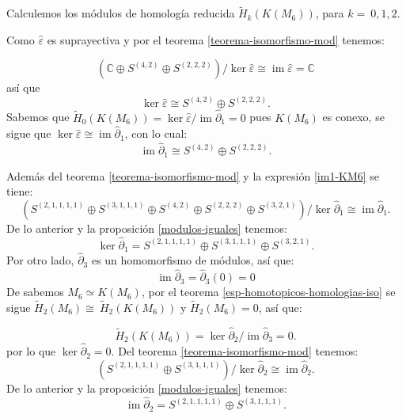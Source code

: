 \documentclass[12pt]{book}
\theoremstyle{definition}
\DeclareMathOperator{\im}{im}
\newcounter{in}
\begin{document}

Calculemos los módulos de homología reducida $\widetilde
H_{k}(K(M_{6}))$, para $k=~0,1,2$.

Como $\widehat\varepsilon$ es suprayectiva y por el teorema
\ref{teorema-isomorfismo-mod} tenemos:

\begin{equation*}
  (\mathbb{C} \oplus S^{(4,2)}\oplus S^{(2,2,2)})/\ker\widehat\varepsilon\cong \im \widehat\varepsilon=\mathbb{C}
\end{equation*}
así que
\begin{equation*}
  \label{ker0-KM6}
  \ker\widehat\varepsilon\cong S^{(4,2)}\oplus S^{(2,2,2)}.
\end{equation*}
Sabemos que $\widetilde H_{0}(K(M_{6}))=\ker \widehat\varepsilon/\im
\widehat\partial_{1}=0$ pues $K(M_{6})$ es conexo, se sigue que $\ker \widehat\varepsilon\cong
\im\widehat\partial_{1}$, con lo cual:
\begin{equation}
  \label{im1-KM6}
  \im \widehat\partial_{1}\cong S^{(4,2)}\oplus S^{(2,2,2)}.
\end{equation}

Además del teorema \ref{teorema-isomorfismo-mod} y la expresión \ref{im1-KM6} se tiene:
$$(S^{(2,1,1,1,1)}\oplus S^{(3,1,1,1)}\oplus S^{(4,2)}\oplus
      S^{(2,2,2)}\oplus S^{(3,2,1)})/\ker \widehat\partial_{1}\cong \im \widehat\partial_{1}.$$
De lo anterior y la proposición \ref{modulos-iguales} tenemos:
\begin{equation}
  \label{ker1-KM6}
  \ker \widehat\partial_{1}=S^{(2,1,1,1,1)}\oplus S^{(3,1,1,1)}\oplus S^{(3,2,1)}.
\end{equation}
Por otro lado, $\widehat\partial_{3}$ es un homomorfismo de módulos, así que:
\begin{equation*}
\im\widehat\partial_{3}=\widehat\partial_{3}(0)=0
\label{im3-KM6}
\end{equation*}
De \cite{larrion2009clique} sabemos $M_{6}\simeq K(M_{6})$,
por el teorema \ref{esp-homotopicos-homologias-iso} se sigue $\widetilde H_{2}(M_{6})\cong~\widetilde H_{2}(K(M_{6}))$ y  $\widetilde
H_{2}(M_{6})=0$, así que:

\begin{equation*}
\widetilde H_{2}(K(M_{6}))=\ker \widehat\partial_{2}/\im \widehat\partial_{3}=0.
\end{equation*}
por lo que $\ker \widehat\partial_{2}=0$. Del teorema
\ref{teorema-isomorfismo-mod} tenemos:
$$(S^{(2,1,1,1,1)}\oplus S^{(3,1,1,1)})/\ker \widehat\partial_{2}\cong \im
\widehat\partial_{2}.$$
De lo anterior y la proposición \ref{modulos-iguales} tenemos:
\begin{equation}
  \im \widehat\partial_{2}=S^{(2,1,1,1,1)}\oplus S^{(3,1,1,1)}.
  \label{im2-KM6}
\end{equation}
\end{document}

